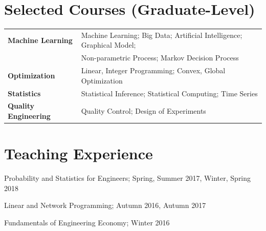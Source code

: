 \documentclass[margin,line,11pt]{resume}
\begin{document}
\begin{resume}
        \section{\mysidestyle Selected Courses (Graduate-Level)}
\vspace{0.5em}
	\begin{tabular}{ll }
          \textbf{Machine Learning} & Machine Learning; Big Data; Artificial Intelligence; Graphical Model; \\
                           &  Non-parametric Process; Markov Decision Process\\
  \textbf{Optimization} & Linear, Integer Programming; Convex,  Global Optimization \\
   \textbf{Statistics}& Statistical Inference; Statistical Computing; Time Series \\
\textbf{Quality Engineering} & Quality Control; Design of Experiments \\
	\end{tabular}

 


        \section{\mysidestyle Teaching Experience}
        \begin{list2}
        \item   Probability and Statistics for Engineers; Spring, Summer 2017, Winter, Spring 2018 
        \item   Linear and Network Programming; Autumn 2016, Autumn 2017
        \item  Fundamentals of Engineering Economy; Winter 2016
        \end{list2}
        

\end{resume}
\end{document}
